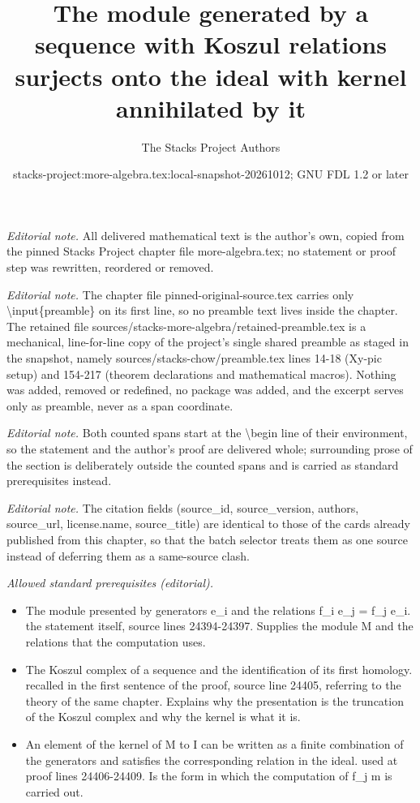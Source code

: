 \documentclass[10pt,a4paper]{amsart}
\title{The module generated by a sequence with Koszul relations surjects onto the ideal with kernel annihilated by it}
\author{The Stacks Project Authors}
\date{stacks-project:more-algebra.tex:local-snapshot-20261012; GNU FDL 1.2 or later}
\theoremstyle{plain}
\theoremstyle{definition}
\theoremstyle{remark}
\numberwithin{equation}{subsection}
\begin{document}
\maketitle
\setcounter{subsection}{1}
\noindent\textit{Editorial note.} All delivered mathematical text is the author's own, copied from the pinned Stacks Project chapter file more-algebra.tex; no statement or proof step was rewritten, reordered or removed.\par\medskip
\noindent\textit{Editorial note.} The chapter file pinned-original-source.tex carries only \textbackslash{}input\{preamble\} on its first line, so no preamble text lives inside the chapter. The retained file sources/stacks-more-algebra/retained-preamble.tex is a mechanical, line-for-line copy of the project's single shared preamble as staged in the snapshot, namely sources/stacks-chow/preamble.tex lines 14-18 (Xy-pic setup) and 154-217 (theorem declarations and mathematical macros). Nothing was added, removed or redefined, no package was added, and the excerpt serves only as preamble, never as a span coordinate.\par\medskip
\noindent\textit{Editorial note.} Both counted spans start at the \textbackslash{}begin line of their environment, so the statement and the author's proof are delivered whole; surrounding prose of the section is deliberately outside the counted spans and is carried as standard prerequisites instead.\par\medskip
\noindent\textit{Editorial note.} The citation fields (source\_id, source\_version, authors, source\_url, license.name, source\_title) are identical to those of the cards already published from this chapter, so that the batch selector treats them as one source instead of deferring them as a same-source clash.\par\medskip
\noindent\textit{Allowed standard prerequisites (editorial).}\begin{itemize}
\item The module presented by generators e\_i and the relations f\_i e\_j = f\_j e\_i. the statement itself, source lines 24394-24397. Supplies the module M and the relations that the computation uses.
\item The Koszul complex of a sequence and the identification of its first homology. recalled in the first sentence of the proof, source line 24405, referring to the theory of the same chapter. Explains why the presentation is the truncation of the Koszul complex and why the kernel is what it is.
\item An element of the kernel of M to I can be written as a finite combination of the generators and satisfies the corresponding relation in the ideal. used at proof lines 24406-24409. Is the form in which the computation of f\_j m is carried out.
\end{itemize}\medskip
\end{document}

